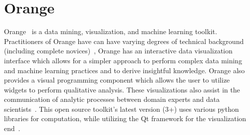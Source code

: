 \section{Orange}

Orange~\cite{hid-sp18-504-orange} is a  data mining, visualization,
and machine learning toolkit. Practitioners of Orange have can have
varying degrees of technical background (including complete
novices)~\cite{hid-sp18-504-orange}, Orange has an interactive data
visualization interface which allows for a simpler approach to
perform complex data mining and machine learning practices and to
derive insightful knowledge. Orange also provides a visual programming
component which allows the user to utilize widgets to perform
qualitative analysis. These visualizations also assist in the communication
of analytic processes between domain experts and data
scientists~\cite{hid-sp18-504-orange}. This open source toolkit's
latest version (3+) uses various python libraries for computation,
while utilizing the Qt framework for the visualization
end~\cite{hid-sp18-504-wiki-orange}.
